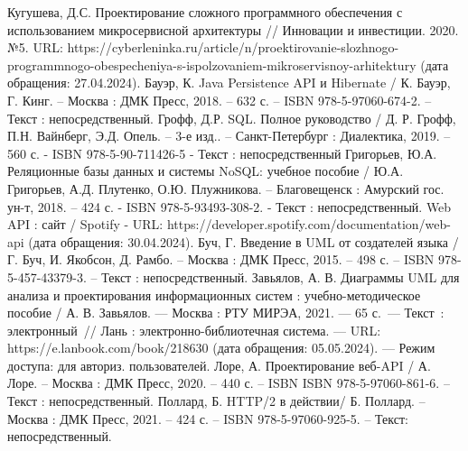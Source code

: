 \begin{thebibliography}{9}
     Кугушева, Д.С. Проектирование сложного программного обеспечения с использованием микросервисной архитектуры // Инновации и инвестиции. 2020. №5. URL: https://cyberleninka.ru/article/n/proektirovanie-slozhnogo-programmnogo-obespecheniya-s-ispolzovaniem-mikroservisnoy-arhitektury (дата обращения: 27.04.2024).
     Бауэр, К. Java Persistence API и Hibernate / К. Бауэр, Г. Кинг. – Москва : ДМК Пресс, 2018. – 632 с. – ISBN 978-5-97060-674-2. – Текст : непосредственный.
     Грофф, Д.Р. SQL. Полное руководство / Д. Р. Грофф, П.Н. Вайнберг, Э.Д. Опель. – 3-е изд.. – Санкт-Петербург : Диалектика, 2019. – 560 с. - ISBN 978-5-90-711426-5 - Текст : непосредственный
     Григорьев, Ю.А. Реляционные базы данных и системы NoSQL: учебное пособие / Ю.А. Григорьев, А.Д. Плутенко, О.Ю. Плужникова. – Благовещенск : Амурский гос. ун-т, 2018. – 424 с. - ISBN 978-5-93493-308-2. - Текст : непосредственный.
     Web API : сайт / Spotify - URL: https://developer.spotify.com/documentation/web-api (дата обращения: 30.04.2024).
     Буч, Г. Введение в UML от создателей языка / Г. Буч, И. Якобсон, Д. Рамбо. – Москва : ДМК Пресс, 2015. – 498 с. – ISBN 978-5-457-43379-3. – Текст : непосредственный.
     Завьялов, А. В. Диаграммы UML для анализа и проектирования информационных систем : учебно-методическое пособие / А. В. Завьялов. — Москва : РТУ МИРЭА, 2021. — 65 с. — Текст : электронный // Лань : электронно-библиотечная система. — URL: https://e.lanbook.com/book/218630 (дата обращения: 05.05.2024). — Режим доступа: для авториз. пользователей.
     Лоре, А. Проектирование веб-API / А. Лоре. – Москва : ДМК Пресс, 2020. – 440 с. – ISBN ISBN 978-5-97060-861-6. – Текст : непосредственный.
     Поллард, Б. HTTP/2 в действии/ Б. Поллард. – Москва : ДМК Пресс, 2021. – 424 с. – ISBN 978-5-97060-925-5. – Текст: непосредственный.
    
\end{thebibliography}
